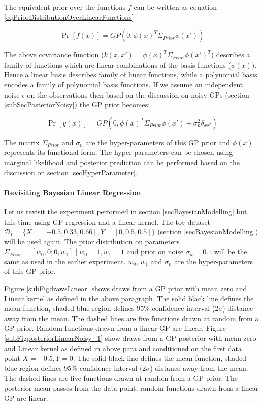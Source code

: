 The equivalent prior over the functions \(f\) can be written as equation \ref{eqPriorDistributionOverLinearFunctions}

\begin{equation}\label{eqPriorDistributionOverLinearFunctions}
    \Pr[f(x)] = GP(0, \phi(x)^{T} \Sigma_{Prior} \phi(x'))
\end{equation}

The above covariance function (\(k(x, x') = \phi(x)^{T} \Sigma_{Prior} \phi(x')^{T}\)) describes a family of functions which are linear combinations of the basis functions (\(\phi(x)\)). Hence a linear basis describes family of linear functions, while a polynomial basis encodes a family of polynomial basis functions. If we assume an independent noise \(\epsilon\) on the observations then based on the discussion on noisy GPs (section \ref{subSecPosteriorNoisy}) the GP prior becomes:

\begin{equation}\label{eqNoisyPriorDistributionOverLinearFunctions}
    \Pr[y(x)] = GP(0, \phi(x)^{T} \Sigma_{Prior} \phi(x') + \sigma_{n}^2\delta_{xx'})
\end{equation}

The matrix \(\Sigma_{Prior}\) and \(\sigma_{n}\) are the hyper-parameters of this GP prior and \(\phi(x)\) represents its functional form. The hyper-parameters can be chosen using marginal likelihood and posterior prediction can be performed based on the discussion on section \ref{secHyperParameter}. 

\paragraph{Revisiting Bayesian Linear Regression}\label{paraLinearGPExperiment}
Let us revisit the experiment performed in section \ref{secBayesianModelling} but this time using GP regression and a linear kernel. The toy-dataset \(\mathcal{D}_{1} = \{X = [-0.5, 0.33, 0.66], Y = [0, 0.5, 0.5]\}\) (section \ref{secBayesianModelling}) will be used again. The prior distribution on parameters \(\Sigma_{Prior} = [w_{0}, 0; 0, w_{1}] \mid w_{0} = 1, w_{1} = 1\) and prior on noise \(\sigma_{n} = 0.1\) will be the same as used in the earlier experiment. \(w_{0}\), \(w_{1}\) and \(\sigma_{n}\) are the hyper-parameters of this GP prior. 

Figure \ref{subFigdrawsLinear} shows draws from a GP prior with mean zero and Linear kernel as defined in the above paragraph. The solid black line defines the mean function, shaded blue region defines 95\% confidence interval (2\(\sigma\)) distance away from the mean. The dashed lines are five functions drawn at random from a GP prior. Random functions drawn from a linear GP are linear. Figure \ref{subFigposteriorLinearNoisy_1} show draws from a GP posterior with mean zero and Linear kernel  as defined in above para and conditioned on the first data point \(X = -0.5, Y = 0\). The solid black line defines the mean function, shaded blue region defines 95\% confidence interval (2\(\sigma\)) distance away from the mean. The dashed lines are five functions drawn at random from a GP prior. The posterior mean passes from the data point, random functions drawn from a linear GP are linear.


